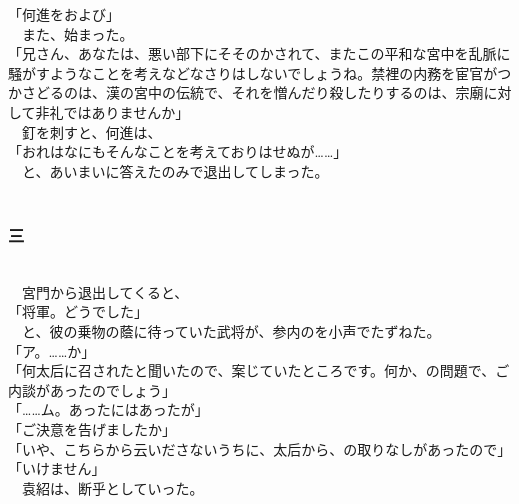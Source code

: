 \documentclass[
  paper=a5,
  fontsize=10pt,
  jafontsize=9.5pt,
  tate,                  %
  open_bracket_pos=nibu, %
]{jlreq}
\begin{document}
「何進をおよび」\\


　また、始まった。\\


「兄さん、あなたは、悪い部下にそそのかされて、またこの平和な宮中を乱脈に騒がすようなことを考えなどなさりはしないでしょうね。禁裡の内務を宦官がつかさどるのは、漢の宮中の伝統で、それを憎んだり殺したりするのは、宗廟に対して非礼ではありませんか」\\


　釘を刺すと、何進は、\\


「おれはなにもそんなことを考えておりはせぬが……」\\


　と、あいまいに答えたのみで退出してしまった。\\

\\

\subsubsection{三}

\\


　宮門から退出してくると、\\


「将軍。どうでした」\\


　と、彼の乗物の蔭に待っていた武将が、参内のを小声でたずねた。\\


「ア。……か」\\


「何太后に召されたと聞いたので、案じていたところです。何か、の問題で、ご内談があったのでしょう」\\


「……ム。あったにはあったが」\\


「ご決意を告げましたか」\\


「いや、こちらから云いださないうちに、太后から、の取りなしがあったので」\\


「いけません」\\


　袁紹は、断乎としていった。\\
\end{document}
